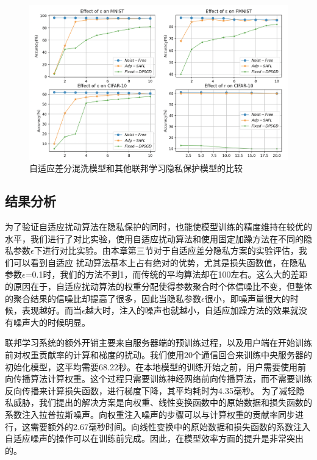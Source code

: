 \begin{figure}[!hbt]
\centering
  	\includegraphics[scale=0.4]{fig2/C5/SA-FL对比实验}%
	\caption{自适应差分混洗模型和其他联邦学习隐私保护模型的比较}
  	\label{自适应差分混洗模型和其他联邦学习隐私保护模型的比较} 
\end{figure}

\subsection{结果分析}
为了验证自适应扰动算法在隐私保护的同时，也能使模型训练的精度维持在较优的水平，我们进行了对比实验，使用自适应扰动算法和使用固定加躁方法在不同的隐私参数$\epsilon$下进行对比实验。由本章第三节对于自适应差分隐私方案的实验评估，我们可以看到自适应
扰动算法基本上占有绝对的优势，尤其是损失函数值，在隐私参数$\epsilon$=0.1时，我们的方法不到1，而传统的平均算法却在100左右。这么大的差距的原因在于，自适应扰动算法的权重分配使得参数聚合时个体信噪比不变，但整体的聚合结果的信噪比却提高了很多，因此当隐私参数$\epsilon$很小，即噪声量很大的时候，表现越好。而当$\epsilon$越大时，注入的噪声也就越小，自适应加躁方法的效果就没有噪声大的时候明显。

联邦学习系统的额外开销主要来自服务器端的预训练过程，以及用户端在开始训练前对权重贡献率的计算和梯度的扰动。我们使用20个通信回合来训练中央服务器的初始化模型，这平均需要68.22秒。在本地模型的训练开始之前，用户需要使用前向传播算法计算权重。这个过程只需要训练神经网络前向传播算法，而不需要训练反向传播来计算损失函数，进行梯度下降，其平均耗时为4.35毫秒。
为了减轻隐私威胁，我们提出的解决方案是向权重、线性变换函数中的原始数据和损失函数的系数注入拉普拉斯噪声。向权重注入噪声的步骤可以与计算权重的贡献率同步进行，这需要额外的2.67毫秒时间。向线性变换中的原始数据和损失函数的系数注入自适应噪声的操作可以在训练前完成。因此，在模型效率方面的提升是非常突出的。

